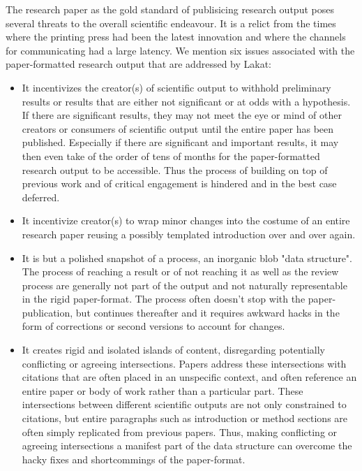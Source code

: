 \documentclass[14pt]{article}
\begin{document}
The research paper as the gold standard of publisicing research output poses several threats to the overall scientific endeavour. It is a relict from the times where the printing press had been the latest innovation and where the channels for communicating had a large latency.  We mention six issues associated with the paper-formatted research output that are addressed by Lakat:
\begin{itemize}

 \item It incentivizes the creator(s) of scientific output to withhold preliminary results or results that are either not significant or at odds with a hypothesis. If there are significant results, they may not meet the eye or mind of other creators or consumers of scientific output until the entire paper has been published. Especially if there are significant and important results, it may then even take of the order of tens of months for the paper-formatted research output to be accessible. Thus the process of building on top of previous work and of critical engagement is hindered and in the best case deferred.
 
\item It incentivize creator(s) to wrap minor changes into the costume of an entire research paper reusing a possibly templated introduction over and over again. 

\item It is but a polished snapshot of a process, an inorganic blob "data structure". The process of reaching a result or of not reaching it as well as the review process are generally not part of the output and not naturally representable in the rigid paper-format. The process often doesn't stop with the paper-publication, but continues thereafter and it requires awkward hacks in the form of corrections or second versions to account for changes.

\item It creates rigid and isolated islands of content, disregarding potentially conflicting or agreeing intersections. Papers address these intersections with citations that are often placed in an unspecific context, and often reference an entire paper or body of work rather than a particular part. These intersections between different scientific outputs are not only constrained to citations, but entire paragraphs such as introduction or method sections are often simply replicated from previous papers. Thus, making conflicting or agreeing intersections a manifest part of the data structure can overcome the hacky fixes and shortcommings of the paper-format.


\end{itemize}
\end{document}
